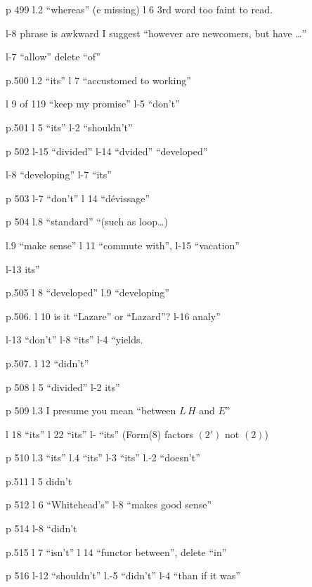 
p 499 l.2 ``whereas'' (e missing) \quad l 6 3rd word too faint to read.

l-8 phrase is awkward I suggest ``however are newcomers, but have \ldots{}''

l-7 ``allow'' delete ``of''

p.500 l.2 ``its'' \quad l 7 ``accustomed to working''

l 9 of 119 ``keep my promise'' \quad l-5 ``don't''

p.501 l 5 ``its'' \quad l-2 ``shouldn't''

p 502 l-15 ``divided'' \quad l-14 ``dvided'' ``developed''

l-8 ``developing'' \quad l-7 ``its''

p 503 l-7 ``don't'' \quad l 14 ``dévissage''

p 504 l.8 ``standard'' \quad ``(such as loop\ldots{})

l.9 ``make sense'' \quad l 11 ``commute with'', \quad l-15 ``vacation''

 l-13 its''

p.505 l 8 ``developed'' \quad l.9 ``developing''

p.506. l 10 is it ``Lazare'' or ``Lazard''? \quad l-16 analy''

l-13 ``don't'' \quad l-8 ``its'' \quad l-4 ``yields.

p.507. l 12 ``didn't''

p 508 l 5 ``divided'' \quad l-2 its''

p 509 l.3 I presume you mean ``between $L\,H$ and $E$''

l 18 ``its'' \quad l 22 ``its'' \quad l- ``its'' \quad (Form(8) factors $(2')$ not $(2)$)

p 510 l.3 ``its'' \quad l.4 ``its'' \quad l-3 ``its'' \quad l.-2 ``doesn't''

p.511 l 5 didn't

p 512 l 6 ``Whitehead's'' \quad l-8 ``makes good sense''

p 514 l-8 ``didn't


p.515 l 7 ``isn't'' \quad l 14 ``functor between'', delete ``in''

p 516 l-12 ``shouldn't'' \quad l.-5 ``didn't'' \quad l-4 ``than if it was''

